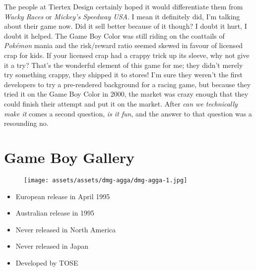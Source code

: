 \documentclass{book}
\begin{document}
The people at Tiertex Design certainly hoped it would differentiate them from \emph{Wacky Races} or \emph{Mickey’s Speedway USA}. I mean it definitely did, I’m talking about their game now. Did it sell better because of it though? I doubt it hurt, I doubt it helped. The Game Boy Color was still riding on the coattails of \emph{Pokémon} mania and the risk/reward ratio seemed skewed in favour of licensed crap for kids. If your licensed crap had a crappy trick up its sleeve, why not give it a try? That’s the wonderful element of this game for me; they didn’t merely try something crappy, they shipped it to stores! I’m sure they weren’t the first developers to try a pre-rendered background for a racing game, but because they tried it on the Game Boy Color in 2000, the market was crazy enough that they could finish their attempt and put it on the market. After \emph{can we technically make it} comes a second question, \emph{is it fun}, and the answer to that question was a resounding no.



\begingroup \chapter*{Game Boy Gallery} \endgroup
\begin{figure}[H]
\vskip 4pt
\centering
\texttt{[image: assets/assets/dmg-agga/dmg-agga-1.jpg]}\end{figure}
\begin{itemize} [nosep]




\item European release in April 1995







\item Australian release in 1995






\item Never released in North America



\item Never released in Japan





\item Developed by TOSE

\end{itemize}\noindent
\end{document}
